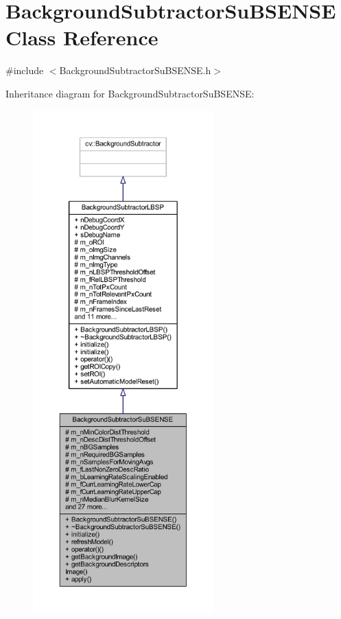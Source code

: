 \hypertarget{class_background_subtractor_su_b_s_e_n_s_e}{}\section{Background\+Subtractor\+Su\+B\+S\+E\+N\+SE Class Reference}
\label{class_background_subtractor_su_b_s_e_n_s_e}


{\ttfamily \#include $<$Background\+Subtractor\+Su\+B\+S\+E\+N\+S\+E.\+h$>$}



Inheritance diagram for Background\+Subtractor\+Su\+B\+S\+E\+N\+SE\+:\nopagebreak
\begin{figure}[H]
\begin{center}
\leavevmode
\includegraphics[height=550pt]{class_background_subtractor_su_b_s_e_n_s_e__inherit__graph}
\end{center}
\end{figure}


